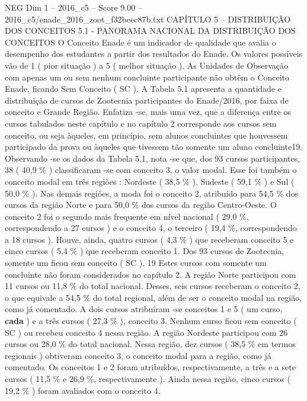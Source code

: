 \begin{textsample}{NEG Dim 1 – 2016\_c5 – Score 9.00 – 2016\_c5/enade\_2016\_zoot\_f32beec87b.txt}  \label{ex:f1_neg_366}
CAPÍTULO 5 – DISTRIBUIÇÃO DOS CONCEITOS 5.1 - PANORAMA NACIONAL DA DISTRIBUIÇÃO DOS CONCEITOS O Conceito Enade é um indicador de qualidade que avalia o desempenho dos estudantes a partir dos resultados do Enade.
Os valores possíveis vão de 1 ( pior situação ) a 5 ( melhor situação ).
As Unidades de Observação com apenas um ou sem nenhum concluinte participante não obtêm o Conceito Enade, ficando Sem Conceito ( SC ).
A Tabela 5.1 apresenta a quantidade e distribuição de cursos de Zootecnia participantes do Enade/2016, por faixa de conceito e Grande Região.
Enfatiza -se, mais uma vez, que a diferença entre os cursos tabulados neste capítulo e no capítulo 2 corresponde aos cursos sem conceito, ou seja àqueles, em princípio, sem alunos concluintes que houvessem participado da prova ou àqueles que tivessem tão somente um aluno concluinte19.
Observando -se os dados da Tabela 5.1, nota -se que, dos 93 cursos participantes, 38 ( 40,9 \% ) classificaram -se com conceito 3, o valor modal.
Esse foi também o conceito modal em três regiões : Nordeste ( 38,5 \% ), Sudeste ( 59,1 \% ) e Sul ( 50,0 \% ).
Nas demais regiões, a moda foi o conceito 2, atribuído para 54,5 \% dos cursos da região Norte e para 50,0 \% dos cursos da região Centro-Oeste.
O conceito 2 foi o segundo mais frequente em nível nacional ( 29,0 \%, correspondendo a 27 cursos ) e o conceito 4, o terceiro ( 19,4 \%, correspondendo a 18 cursos ).
Houve, ainda, quatro cursos ( 4,3 \% ) que receberam conceito 5 e cinco cursos ( 5,4 \% ) que receberam conceito 1.
Dos 93 cursos de Zootecnia, somente um ficou sem conceito ( SC ). 19 Estes cursos com somente um concluinte não foram considerados no capítulo 2.
A região Norte participou com 11 cursos ou 11,8 \% do total nacional.
Desses, seis cursos receberam o conceito 2, o que equivale a 54,5 \% do total regional, além de ser o conceito modal na região, como já comentado.
A dois cursos atribuíram -se conceitos 1 e 5 ( um curso, \textbf{cada} ) e a três cursos ( 27,3 \% ), conceito 3.
Nenhum curso ficou sem conceito ( SC ) ou recebeu conceito 4 nessa região.
A região Nordeste participou com 26 cursos ou 28,0 \% do total nacional.
Nessa região, dez cursos ( 38,5 \% em termos regionais ) obtiveram conceito 3, o conceito modal para a região, como já comentado.
Os conceitos 1 e 2 foram atribuídos, respectivamente, a três e a sete cursos ( 11,5 \% e 26,9 \%, respectivamente ).
Ainda nessa região, cinco cursos ( 19,2 \% ) foram avaliados com o conceito 4.

\end{textsample}
